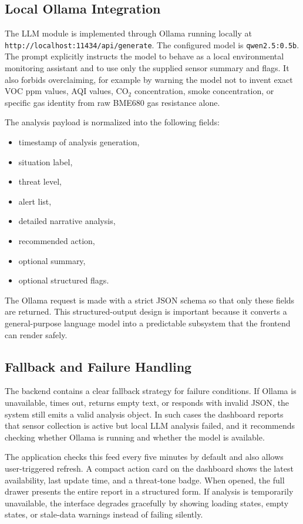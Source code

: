 \documentclass[conference]{IEEEtran}
\begin{document}
\subsection{Local Ollama Integration}
The LLM module is implemented through Ollama running locally at \texttt{http://localhost:11434/api/generate}. The configured model is \texttt{qwen2.5:0.5b}. The prompt explicitly instructs the model to behave as a local environmental monitoring assistant and to use only the supplied sensor summary and flags. It also forbids overclaiming, for example by warning the model not to invent exact VOC ppm values, AQI values, CO$_2$ concentration, smoke concentration, or specific gas identity from raw BME680 gas resistance alone.

The analysis payload is normalized into the following fields:
\begin{itemize}
\item timestamp of analysis generation,
\item situation label,
\item threat level,
\item alert list,
\item detailed narrative analysis,
\item recommended action,
\item optional summary,
\item optional structured flags.
\end{itemize}

The Ollama request is made with a strict JSON schema so that only these fields are returned. This structured-output design is important because it converts a general-purpose language model into a predictable subsystem that the frontend can render safely.

\subsection{Fallback and Failure Handling}
The backend contains a clear fallback strategy for failure conditions. If Ollama is unavailable, times out, returns empty text, or responds with invalid JSON, the system still emits a valid analysis object. In such cases the dashboard reports that sensor collection is active but local LLM analysis failed, and it recommends checking whether Ollama is running and whether the model is available.

The application checks this feed every five minutes by default and also allows user-triggered refresh. A compact action card on the dashboard shows the latest availability, last update time, and a threat-tone badge. When opened, the full drawer presents the entire report in a structured form. If analysis is temporarily unavailable, the interface degrades gracefully by showing loading states, empty states, or stale-data warnings instead of failing silently.
\end{document}
